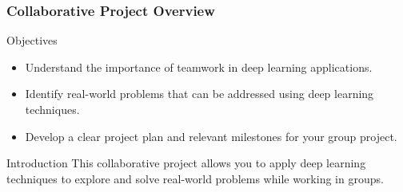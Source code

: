 \documentclass[aspectratio=169]{beamer}
\begin{document}
\begin{frame}[fragile]
    \frametitle{Collaborative Project Overview}
    
    \begin{block}{Objectives}
        \begin{itemize}
            \item Understand the importance of teamwork in deep learning applications.
            \item Identify real-world problems that can be addressed using deep learning techniques.
            \item Develop a clear project plan and relevant milestones for your group project.
        \end{itemize}
    \end{block}
    
    \begin{block}{Introduction}
        This collaborative project allows you to apply deep learning techniques to explore and solve real-world problems while working in groups.
    \end{block}
\end{frame}
\end{document}
